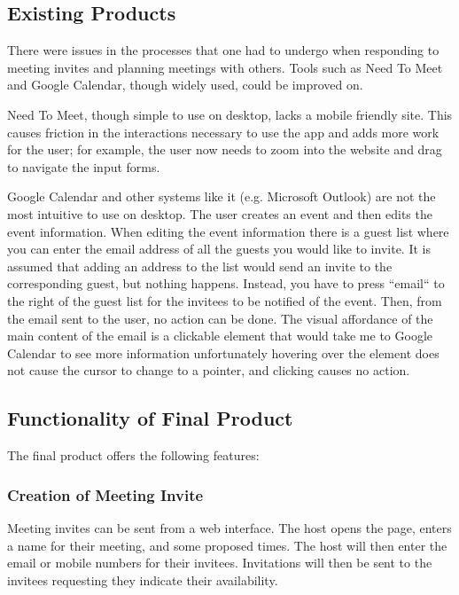 \documentclass{sigchi}
\begin{document}
\subsection{Existing Products}

There were issues in the processes that one had to undergo when responding to meeting invites and planning meetings with others. Tools such as Need To Meet and Google Calendar, though widely used, could be improved on.

Need To Meet, though simple to use on desktop, lacks a mobile friendly site. This causes friction in the interactions necessary to use the app and adds more work for the user; for example, the user now needs to zoom into the website and drag to navigate the input forms. 

Google Calendar and other systems like it (e.g. Microsoft Outlook) are not the most intuitive to use on desktop. The user creates an event and then edits the event information. When editing the event information there is a guest list where you can enter the email address of all the guests you would like to invite. It is assumed that adding an address to the list would send an invite to the corresponding guest, but nothing happens. Instead, you have to press ``email`` to the right of the guest list for the invitees to be notified of the event. Then, from the email sent to the user, no action can be done. The visual affordance of the main content of the email is a clickable element that would take me to Google Calendar to see more information \textemdash unfortunately hovering over the element does not cause the cursor to change to a pointer, and clicking causes no action. 


\subsection{Functionality of Final Product}

The final product offers the following features:

\subsubsection{Creation of Meeting Invite}
Meeting invites can be sent from a web interface.
The host opens the page, enters a name for their meeting, and some proposed times.
The host will then enter the email or mobile numbers for their invitees.
Invitations will then be sent to the invitees requesting they indicate their availability.
\end{document}
